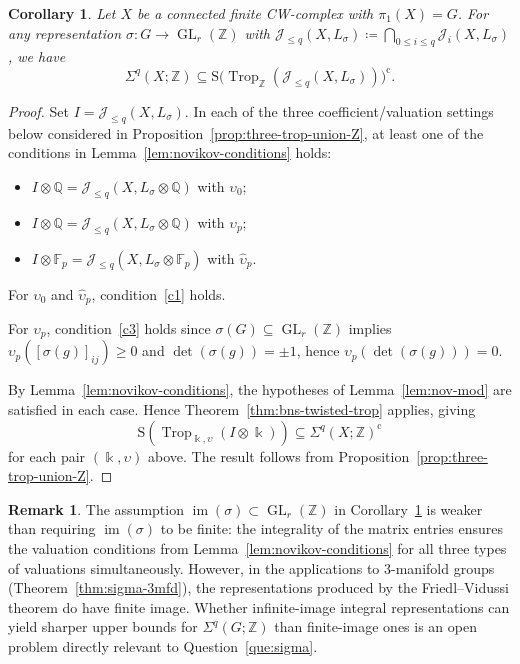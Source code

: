 \documentclass[11pt]{amsart}
\newtheorem{corollary}[theorem]{Corollary}
\theoremstyle{definition}
\newtheorem{remark}[theorem]{Remark}
\newcommand{\Z}{\mathbb{Z}}
\newcommand{\Q}{\mathbb{Q}}
\newcommand{\F}{\mathbb{F}}
\renewcommand{\k}{\Bbbk}
\newcommand{\cJ}{\mathcal{J}}
\newcommand{\rS}{\mathrm{S}}
\DeclareMathOperator{\im}{im}
\DeclareMathOperator{\GL}{GL}
\DeclareMathOperator{\Trop}{Trop}
\newcommand{\compl}{\mathrm{c}}
\begin{document}
\begin{corollary}
\label{cor:twist-bound}
Let $X$ be a connected finite CW-complex with $\pi_1(X)=G$. 
For any representation $\sigma\colon G\to \GL_r(\Z)$ with 
$\cJ_{\leq q}(X,L_\sigma)\coloneqq \bigcap_{0\leq i \leq q} \cJ_{ i}(X,L_\sigma)$, 
we have
\[
\Sigma^q(X;\Z) \subseteq 
\rS\big(\!\Trop_\Z( \cJ_{\le q}(X,L_{\sigma}))\big)^{\compl}.
\]
\end{corollary}

\begin{proof}
Set $I=\cJ_{\le q}(X,L_{\sigma})$.    
In each of the three coefficient/valuation settings below considered 
in Proposition~\ref{prop:three-trop-union-Z}, at least one
of the conditions in Lemma~\ref{lem:novikov-conditions} holds:
\begin{itemize}[itemsep=1.5pt]
\item $I\otimes \Q = \cJ_{\le q}(X,L_{\sigma}\otimes \Q)$ with $\upsilon_0$;
\item $I\otimes \Q = \cJ_{\le q}(X,L_{\sigma}\otimes \Q)$ with $\upsilon_p$;
\item $I\otimes \F_p = \cJ_{\le q}(X,L_{\sigma}\otimes \F_p)$ with $\hat{\upsilon}_p$.
\end{itemize}    
    
For $\upsilon_0$ and $\hat{\upsilon}_p$, condition~\ref{c1} holds.

For $\upsilon_p$, condition~\ref{c3} holds since
$\sigma(G)\subseteq \GL_r(\Z)$ implies
$\upsilon_p([\sigma(g)]_{ij})\ge 0$ and
$\det(\sigma(g))=\pm 1$, hence $\upsilon_p(\det(\sigma(g)))=0$.

By Lemma~\ref{lem:novikov-conditions}, the hypotheses of
Lemma~\ref{lem:nov-mod} are satisfied in each case.
Hence Theorem~\ref{thm:bns-twisted-trop} applies, giving
\[
\rS(\Trop_{\k,\upsilon}( I\otimes\k))
\subseteq \Sigma^q(X;\Z)^{\compl}
\]
for each pair $(\k,\upsilon)$ above.
The result follows from Proposition~\ref{prop:three-trop-union-Z}.
\end{proof}

\begin{remark}
\label{rem:integral-vs-finite}
The assumption $\im(\sigma)\subset \GL_r(\Z)$ in 
Corollary~\ref{cor:twist-bound} is weaker than 
requiring $\im(\sigma)$ to be finite: the integrality of 
the matrix entries ensures the valuation conditions from 
Lemma~\ref{lem:novikov-conditions} for all three types of valuations 
simultaneously. However, in the applications to 
$3$-manifold groups (Theorem~\ref{thm:sigma-3mfd}), 
the representations produced by the Friedl--Vidussi theorem 
do have finite image. Whether infinite-image integral representations can 
yield sharper upper bounds for $\Sigma^q(G;\Z)$ than 
finite-image ones is an open problem directly 
relevant to Question~\ref{que:sigma}.
\end{remark}
\end{document}
